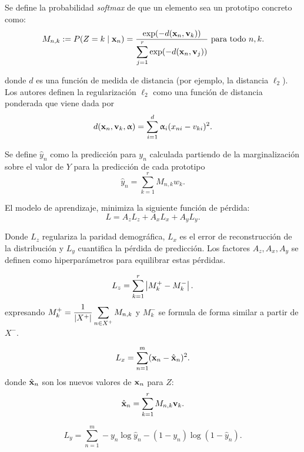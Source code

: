 \documentclass[oneside,openright,titlepage,numbers=noenddot,openany,headinclude,footinclude=true,
cleardoublepage=empty,abstractoff,BCOR=5mm,paper=a4,fontsize=12pt,main=spanish]{scrreprt}
\begin{document}
Se define la probabilidad \textit{softmax} de que un elemento sea un prototipo concreto como:
\begin{equation*}
M_{n,k}:= P(Z=k \mid \nm{x}_n)=\ddfrac{\text{exp}(-d(\nm{x}_n,\nm{v}_k))}{\sum_{j=1}^r \text{exp}(-d(\nm{x}_n,\nm{v}_j))} \ \text{para todo} \ n,k.
\end{equation*}

donde $d$ es una función de medida de distancia (por ejemplo, la distancia $\ell_2$). Los autores definen la regularización $\ell_2$ como una función de distancia ponderada que viene dada por
\begin{equation*}
d(\textbf{x}_n,\textbf{v}_k,\upalpha)=\sum_{i=1}^d \upalpha_i (x_{ni}-v_{ki})^2.
\end{equation*}

Se define $\hat{y}_n$ como la predicción para $y_n$ calculada partiendo de la marginalización sobre el valor de $Y$ para la predicción de cada prototipo
\begin{equation*}
\hat{y}_n=\sum_{k=1}^r M_{n,k} w_k.
\end{equation*}

El modelo de aprendizaje, minimiza la siguiente función de pérdida:
\begin{equation*}
L=A_zL_z+A_xL_x+A_yL_y.   
\end{equation*}

Donde $L_z$ regulariza la paridad demográfica, $L_x$ es el error de reconstrucción de la distribución y $L_y$ cuantifica la pérdida de predicción. Los factores $A_z, A_x, A_y$ se definen como hiperparámetros para equilibrar estas pérdidas.

\begin{equation*}
L_z=\sum_{k=1}^r \left\lvert M_k^+-M_k^-\right\rvert.
\end{equation*}
expresando $\displaystyle M_k^+=\frac{1}{\left\lvert X^+\right\rvert} \sum_{n\in X^+} M_{n,k}$ y $M_k^-$ se formula de forma similar a partir de $X^-$.

\begin{equation*}
L_x=\sum_{n=1}^m (\textbf{x}_n-\hat{\textbf{x}}_n)^2.
\end{equation*}
donde $\hat{\textbf{x}}_n$ son los nuevos valores de $\textbf{x}_n$ para $Z$:
\begin{equation*}
\hat{\textbf{x}}_n=\sum_{k=1}^r M_{n,k}\textbf{v}_k.
\end{equation*}

\begin{equation*}
L_y=\sum_{n=1}^m -y_n \log \hat{y}_n -(1-y_n) \log (1-\hat{y}_n).
\end{equation*}
\end{document}

